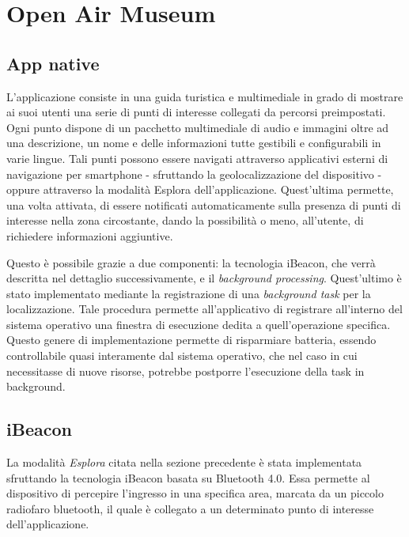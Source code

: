\chapter{Open Air Museum} %
\label{Open Air Museum}

\vspace{5mm}

\section{App native}\vspace{5mm}

L’applicazione consiste in una guida turistica e multimediale in grado di mostrare ai suoi utenti una serie di punti di interesse collegati da percorsi preimpostati. Ogni punto dispone di un pacchetto multimediale di audio e immagini oltre ad una descrizione, un nome e delle informazioni tutte gestibili e configurabili in varie lingue. Tali punti possono essere navigati attraverso applicativi esterni di navigazione per smartphone - sfruttando la geolocalizzazione del dispositivo - oppure attraverso la modalità Esplora dell’applicazione. Quest'ultima permette, una volta attivata, di essere notificati automaticamente sulla presenza di punti di interesse nella zona circostante, dando la possibilità o meno, all’utente, di richiedere informazioni aggiuntive. \vspace{5mm}

Questo è possibile grazie a due componenti: la tecnologia iBeacon\cite{iBeacon}, che verrà descritta nel dettaglio successivamente, e il \emph{background processing}. Quest'ultimo è stato implementato mediante la registrazione di una \emph{background task} per la localizzazione. Tale procedura permette all'applicativo di registrare all'interno del sistema operativo una finestra di esecuzione dedita a quell'operazione specifica. Questo genere di implementazione permette di risparmiare batteria, essendo controllabile quasi interamente dal sistema operativo, che nel caso in cui necessitasse di nuove risorse, potrebbe postporre l'esecuzione della task in background.

\section{iBeacon}\vspace{5mm}

La modalità \emph{Esplora} citata nella sezione precedente è stata implementata sfruttando la tecnologia iBeacon basata su Bluetooth 4.0\cite{Bluetooth}. Essa permette al dispositivo di percepire l’ingresso in una specifica area, marcata da un piccolo radiofaro bluetooth, il quale è collegato a un determinato punto di interesse dell'applicazione.\vspace{5mm}

